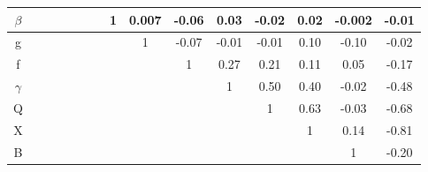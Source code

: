 \begin{table}[p]
{\begin{minipage}{24.4cm}
\begin{tabular}{|c|c|c|c|c|c|c|c|c|c|c|c|c|c|c|}
    \hline
    \cellcolor{dark-gray}$\beta$ & \cellcolor{light-gray} & \cellcolor{light-gray} & \cellcolor{light-gray} & \cellcolor{light-gray} & \cellcolor{light-gray} & \cellcolor{light-gray} & \cellcolor{light-gray}1 & 0.007 & -0.06 & 0.03 & -0.02 & 0.02 & -0.002 & -0.01 \\
    \hline
    \cellcolor{dark-gray}g & \cellcolor{light-gray} & \cellcolor{light-gray} & \cellcolor{light-gray} & \cellcolor{light-gray} & \cellcolor{light-gray} & \cellcolor{light-gray} & \cellcolor{light-gray} & \cellcolor{light-gray}1 & -0.07 & -0.01 & -0.01 & 0.10 & -0.10 & -0.02 \\
    \hline
    \cellcolor{dark-gray}f & \cellcolor{light-gray} & \cellcolor{light-gray} & \cellcolor{light-gray} & \cellcolor{light-gray} & \cellcolor{light-gray} & \cellcolor{light-gray} & \cellcolor{light-gray} & \cellcolor{light-gray} & \cellcolor{light-gray}1 & 0.27 & 0.21 & 0.11 & 0.05 & -0.17\\
    \hline
    \cellcolor{dark-gray}$\gamma$ & \cellcolor{light-gray} & \cellcolor{light-gray} & \cellcolor{light-gray} & \cellcolor{light-gray} & \cellcolor{light-gray} & \cellcolor{light-gray} & \cellcolor{light-gray} & \cellcolor{light-gray} & \cellcolor{light-gray} & \cellcolor{light-gray}1 & \cellcolor{orange}0.50 & \cellcolor{orange}0.40 & -0.02 & \cellcolor{orange}-0.48\\
    \hline
    \cellcolor{dark-gray}Q & \cellcolor{light-gray} & \cellcolor{light-gray} & \cellcolor{light-gray} & \cellcolor{light-gray} & \cellcolor{light-gray} & \cellcolor{light-gray} & \cellcolor{light-gray} & \cellcolor{light-gray} & \cellcolor{light-gray} & \cellcolor{light-gray} & \cellcolor{light-gray}1 & \cellcolor{orange}0.63 & -0.03 & \cellcolor{orange}-0.68\\
    \hline
    \cellcolor{dark-gray}X & \cellcolor{light-gray} & \cellcolor{light-gray} & \cellcolor{light-gray} & \cellcolor{light-gray} & \cellcolor{light-gray} & \cellcolor{light-gray} & \cellcolor{light-gray} & \cellcolor{light-gray} & \cellcolor{light-gray} & \cellcolor{light-gray} & \cellcolor{light-gray} & \cellcolor{light-gray}1 & 0.14 & \cellcolor{green}-0.81 \\
    \hline
    \cellcolor{dark-gray}B & \cellcolor{light-gray} & \cellcolor{light-gray} & \cellcolor{light-gray} & \cellcolor{light-gray} & \cellcolor{light-gray} & \cellcolor{light-gray} & \cellcolor{light-gray} & \cellcolor{light-gray} & \cellcolor{light-gray} & \cellcolor{light-gray} & \cellcolor{light-gray} & \cellcolor{light-gray} & \cellcolor{light-gray}1 & -0.20\\

\end{tabular}
\end{minipage}}
\end{table}
